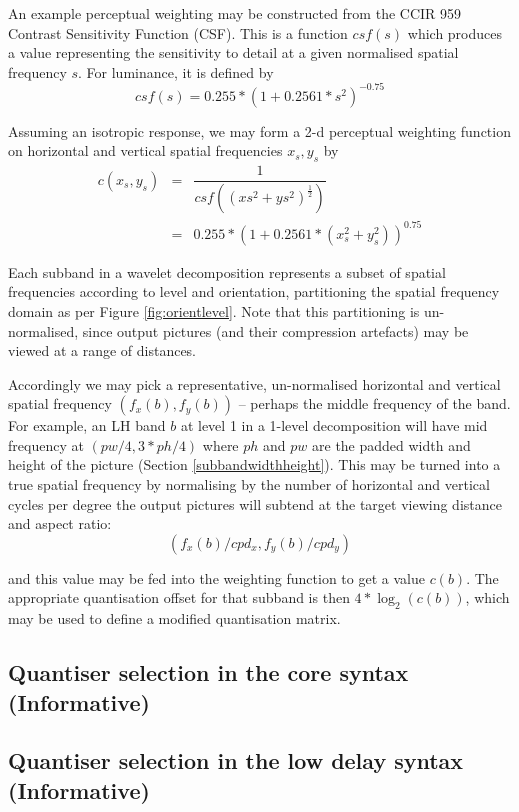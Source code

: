 \begin{informative*}
An example perceptual weighting may be constructed from the CCIR 959 Contrast Sensitivity
Function (CSF). This is a function $csf(s)$ which produces a value representing the
sensitivity to detail at a given normalised spatial frequency $s$. For luminance, it is defined
by 
\[csf(s)=0.255*(1+0.2561*s^2)^{-0.75}\]

Assuming an isotropic response, we may form a 2-d perceptual weighting function on 
horizontal and vertical spatial frequencies $x_s,y_s$ by
\begin{eqnarray*}
c(x_s,y_s) & = & \dfrac{1}{csf((xs^2+ys^2)^{\frac{1}{2}})} \\
& = & 0.255*(1+0.2561*(x_s^2+y_s^2))^{0.75}
\end{eqnarray*}

Each subband in a wavelet decomposition represents a subset of spatial frequencies according
to level and orientation, partitioning the spatial frequency domain as per Figure \ref{fig:orientlevel}.
Note that this partitioning is un-normalised, since output pictures (and their compression artefacts) may
be viewed at a range of distances. 

Accordingly we may pick a representative, un-normalised horizontal and vertical spatial frequency $(f_x(b),f_y(b))$ -- perhaps the middle frequency of the band. For example, an LH band $b$ at level 1 in a 1-level 
decomposition will have mid frequency at $(pw/4,3*ph/4)$ where $ph$ and $pw$ are the padded
width and height of the picture (Section \ref{subbandwidthheight}). This may be turned into a true
spatial frequency by normalising by the number of horizontal and vertical cycles per degree the output
pictures will subtend at the target viewing distance and aspect ratio:
\[ (f_x(b)/cpd_x,f_y(b)/cpd_y)\]

and this value may be fed into the weighting function to get a value $c(b)$. The appropriate
quantisation offset for that subband is then $4*\log_2(c(b))$, which may be used to define a modified
quantisation matrix.
\subsection{Quantiser selection in the core syntax (Informative)}
\label{qselectcore}

\subsection{Quantiser selection in the low delay syntax (Informative)}
\label{qselectld}



\end{informative*}